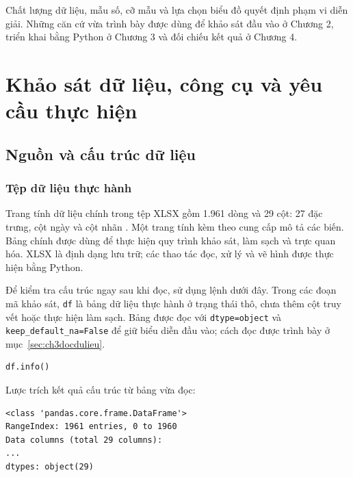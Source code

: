 \documentclass[12pt,a4paper,oneside]{report}
\newcommand{\tenCot}[1]{\texttt{\detokenize{#1}}}
\newcommand{\maCot}[1]{{\urlstyle{tt}\def\UrlBreaks{\do\_\do\/\do\.}\def\UrlBigBreaks{}\nolinkurl{#1}}}
\begin{document}
Chất lượng dữ liệu, mẫu số, cỡ mẫu và lựa chọn biểu đồ quyết định phạm vi diễn giải. Những căn cứ vừa trình bày được dùng để khảo sát đầu vào ở Chương 2, triển khai bằng Python ở Chương 3 và đối chiếu kết quả ở Chương 4.
\chapter{Khảo sát dữ liệu, công cụ và yêu cầu thực hiện}
\label{chap:khaosatdulieu}

\section{Nguồn và cấu trúc dữ liệu}
\label{sec:nguondulieu}

\subsection{Tệp dữ liệu thực hành}

Trang tính dữ liệu chính trong tệp XLSX gồm 1.961 dòng và 29 cột: 27 đặc trưng, cột ngày \tenCot{Production_Date} và cột nhãn \tenCot{Faults}. Một trang tính kèm theo cung cấp mô tả các biến. Bảng chính được dùng để thực hiện quy trình khảo sát, làm sạch và trực quan hóa. XLSX là định dạng lưu trữ; các thao tác đọc, xử lý và vẽ hình được thực hiện bằng Python.

Để kiểm tra cấu trúc ngay sau khi đọc, sử dụng lệnh dưới đây. Trong các đoạn mã khảo sát, \maCot{df} là bảng dữ liệu thực hành ở trạng thái thô, chưa thêm cột truy vết hoặc thực hiện làm sạch. Bảng được đọc với \maCot{dtype=object} và \maCot{keep_default_na=False} để giữ biểu diễn đầu vào; cách đọc được trình bày ở mục~\ref{sec:ch3docdulieu}.

\noindent\begin{minipage}{\linewidth}
\begin{lstlisting}[language=Python]
df.info()
\end{lstlisting}
\end{minipage}\par

Lược trích kết quả cấu trúc từ bảng vừa đọc:

\noindent\begin{minipage}{\linewidth}
\begin{lstlisting}[language={}]
<class 'pandas.core.frame.DataFrame'>
RangeIndex: 1961 entries, 0 to 1960
Data columns (total 29 columns):
...
dtypes: object(29)
\end{lstlisting}
\end{minipage}\par
\end{document}
